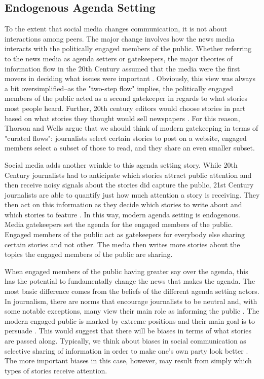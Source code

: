 \documentclass[12pt]{article}
\begin{document}
\begin{doublespace}
\section{Endogenous Agenda Setting}

To the extent that social media changes communication, it is not about interactions among peers. The major change involves how the news media interacts with the politically engaged members of the public. Whether referring to the news media as agenda setters or gatekeepers, the major theories of information flow in the 20th Century assumed that the media were the first movers in deciding what issues were important \citep{IyengarKinder1987}. Obviously, this view was always a bit oversimplified--as the "two-step flow" implies, the politically engaged members of the public acted as a second gatekeeper in regards to what stories most people heard. Further, 20th century editors would choose stories in part based on what stories they thought would sell newspapers \citep{XXXX}. For this reason, Thorson and Wells \citeyearpar{ThorsonWells2015} argue that we should think of modern gatekeeping in terms of "curated flows": journalists select certain stories to post on a website, engaged members select a subset of those to read, and they share an even smaller subset.

Social media adds another wrinkle to this agenda setting story. While 20th Century journalists had to anticipate which stories attract public attention and then receive noisy signals about the stories did capture the public, 21st Century journalists are able to quantify just how much attention a story is receiving. They then act on this information as they decide which stories to write about and which stories to feature \citep{XXX}. In this way, modern agenda setting is endogenous. Media gatekeepers set the agenda for the engaged members of the public. Engaged members of the public act as gatekeepers for everybody else sharing certain stories and not other. The media then writes more stories about the topics the engaged members of the public are sharing.

When engaged members of the public having greater say over the agenda, this has the potential to fundamentally change the news that makes the agenda. The most basic difference comes from the beliefs of the different agenda setting actors. In journalism, there are norms that encourage journalists to be neutral and, with some notable exceptions, many view their main role as informing the public \citep{XXXX}. The modern engaged public is marked by extreme positions \citep{Abramowitz2010} and their main goal is to persuade \citep{AhnHuckfeldtRyan2014}. This would suggest that there will be biases in terms of what stories are passed along. Typically, we think about biases in social communication as selective sharing of information in order to make one's own party look better \citep{AhnRyan2015,PietrykaND}. The more important biases in this case, however, may result from simply which types of stories receive attention.  


\end{doublespace}
\end{document}
